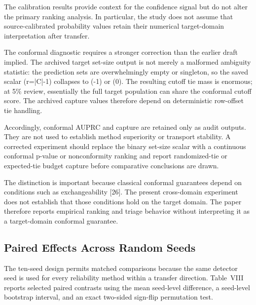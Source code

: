 \documentclass[conference]{IEEEtran}
\begin{document}
The calibration results provide context for the confidence signal but do not alter the primary ranking analysis. In particular, the study does not assume that source-calibrated probability values retain their numerical target-domain interpretation after transfer.

 The conformal diagnostic requires a stronger correction than the earlier draft implied.
 The archived target set-size output is not merely a malformed ambiguity statistic: the prediction sets are overwhelmingly empty or singleton, so the saved scalar (r=|C|-1) collapses to (-1) or (0). The resulting cutoff tie mass is enormous; at 5\% review, essentially the full target population can share the conformal cutoff score. The archived capture values therefore depend on deterministic row-offset tie handling.

 Accordingly, conformal AUPRC and capture are retained only as audit outputs. They are not used to establish method superiority or transport stability. A corrected experiment should replace the binary set-size scalar with a continuous conformal p-value or nonconformity ranking and report randomized-tie or expected-tie budget capture before comparative conclusions are drawn.

 The distinction is important because classical conformal guarantees depend on conditions such as exchangeability [26]. The present cross-domain experiment does not establish that those conditions hold on the target domain. The paper therefore reports empirical ranking and triage behavior without interpreting it as a target-domain conformal guarantee.

\subsection{Paired Effects Across Random Seeds}

The ten-seed design permits matched comparisons because the same detector seed is used for every reliability method within a transfer direction. Table~VIII reports selected paired contrasts using the mean seed-level difference, a seed-level bootstrap interval, and an exact two-sided sign-flip permutation test.
\end{document}
